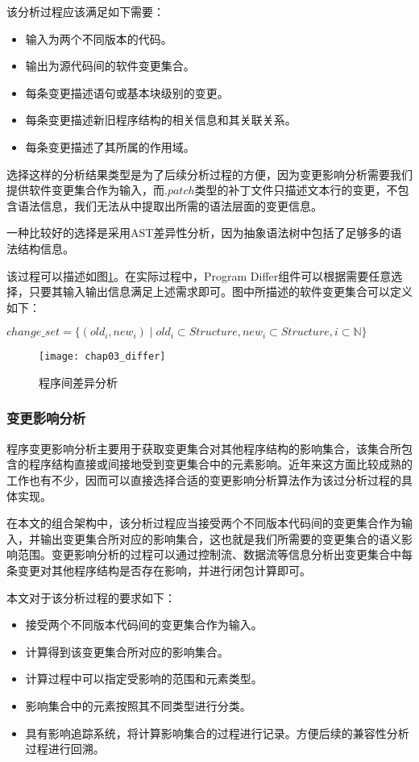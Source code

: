 该分析过程应该满足如下需要：
\begin{itemize}
	\item 输入为两个不同版本的代码。
	\item 输出为源代码间的软件变更集合。
	\item 每条变更描述语句或基本块级别的变更。
	\item 每条变更描述新旧程序结构的相关信息和其关联关系。
	\item 每条变更描述了其所属的作用域。
\end{itemize}

选择这样的分析结果类型是为了后续分析过程的方便，因为变更影响分析需要我们提供软件变更集合作为输入，而$.patch$类型的补丁文件只描述文本行的变更，不包含语法信息，我们无法从中提取出所需的语法层面的变更信息。

一种比较好的选择是采用AST差异性分析，因为抽象语法树中包括了足够多的语法结构信息。

该过程可以描述如图\ref {differ}。在实际过程中，Program Differ组件可以根据需要任意选择，只要其输入输出信息满足上述需求即可。图中所描述的软件变更集合可以定义如下：
\begin{definition}
	$ change\_set = \{ (old_i,new_i) \mid  old_i \subset Structure,new_i \subset Structure, i \subset \mathbb{N} \}$
\end{definition}

\begin{figure}[H]
	\centering
	\texttt{[image: chap03\_differ]}
	\caption {程序间差异分析}
	\label {differ}	
\end{figure}

\subsubsection{变更影响分析}

程序变更影响分析主要用于获取变更集合对其他程序结构的影响集合，该集合所包含的程序结构直接或间接地受到变更集合中的元素影响。近年来这方面比较成熟的工作也有不少，因而可以直接选择合适的变更影响分析算法作为该过分析过程的具体实现。

在本文的组合架构中，该分析过程应当接受两个不同版本代码间的变更集合作为输入，并输出变更集合所对应的影响集合，这也就是我们所需要的变更集合的语义影响范围。变更影响分析的过程可以通过控制流、数据流等信息分析出变更集合中每条变更对其他程序结构是否存在影响，并进行闭包计算即可。

本文对于该分析过程的要求如下：
\begin{itemize}
	\item 接受两个不同版本代码间的变更集合作为输入。
	\item 计算得到该变更集合所对应的影响集合。
	\item 计算过程中可以指定受影响的范围和元素类型。
	\item 影响集合中的元素按照其不同类型进行分类。
	\item 具有影响追踪系统，将计算影响集合的过程进行记录。方便后续的兼容性分析过程进行回溯。
\end{itemize}

